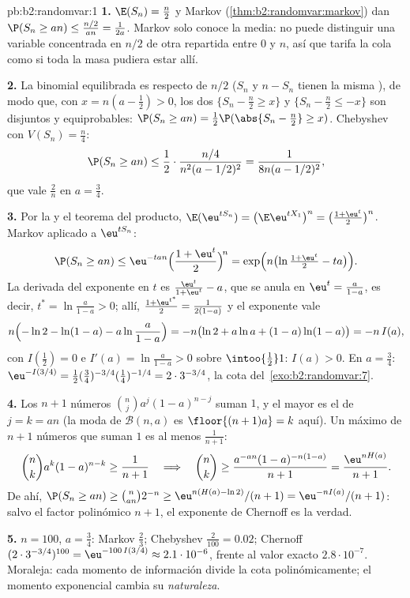 \begin{solution}{pb:b2:randomvar:1}
\textbf{1.} $\E(S_n) = \frac n2$ y Markov
(\cref{thm:b2:randomvar:markov}) dan $\P(S_n \geq an) \leq
\frac{n/2}{an} = \frac1{2a}$. Markov solo conoce la media: no puede
distinguir una variable concentrada en $n/2$ de otra repartida entre
$0$ y $n$, así que tarifa la cola como si toda la masa pudiera estar
allí.

\textbf{2.} La binomial equilibrada es  respecto de $n/2$
($S_n$ y $n - S_n$ tienen la misma ), de modo que, con $x = n(a -
\frac12) > 0$, los dos  $\{S_n - \frac n2 \geq x\}$ y $\{S_n -
\frac n2 \leq -x\}$ son disjuntos y equiprobables: $\P(S_n \geq an) =
\frac12\P(\abs{S_n - \frac n2} \geq x)$. Chebyshev con $V(S_n) =
\frac n4$:
\[
\P(S_n \geq an)
\leq \frac12\cdot\frac{n/4}{n^2(a - 1/2)^2}
= \frac1{8n(a - 1/2)^2},
\]
que vale $\frac2n$ en $a = \frac34$.

\textbf{3.} Por la  y el teorema del producto,
$\E(\eu^{tS_n}) = \bigl(\E \eu^{tX_1}\bigr)^n = \bigl(\frac{1 +
\eu^t}2\bigr)^n$. Markov aplicado a $\eu^{tS_n}$:
\[
\P(S_n \geq an) \leq \eu^{-tan}\Bigl(\frac{1 +
\eu^t}2\Bigr)^{\!n} = \exp\Bigl(n\bigl(\ln\tfrac{1 +
\eu^t}2 - ta\bigr)\Bigr).
\]
La derivada del exponente en $t$ es $\frac{\eu^t}{1 + \eu^t} - a$,
que se anula en $\eu^t = \frac a{1-a}$, es decir, $t^* = \ln\frac
a{1-a} > 0$; allí, $\frac{1 + \eu^{t^*}}2 = \frac1{2(1-a)}$ y el
exponente vale
\[
n\Bigl(-\ln 2 - \ln(1-a) - a\ln\frac a{1-a}\Bigr)
= -n\bigl(\ln2 + a\ln a + (1-a)\ln(1-a)\bigr) = -n\,I(a),
\]
con $I(\frac12) = 0$ e $I'(a) = \ln\frac a{1-a} > 0$ sobre
$\intoo{\frac12}1$: $I(a) > 0$. En $a = \frac34$: $\eu^{-I(3/4)} =
\frac12(\tfrac34)^{-3/4}(\tfrac14)^{-1/4} = 2\cdot3^{-3/4}$, la cota
del~\cref{exo:b2:randomvar:7}.

\textbf{4.} Los $n + 1$ números $\binom nja^j(1-a)^{n-j}$ suman $1$,
y el mayor es el de $j = k = an$ (la moda de $\mathcal B(n, a)$ es
$\floor{(n+1)a} = k$ aquí). Un máximo de $n + 1$ números que suman
$1$ es al menos $\frac1{n+1}$:
\[
\binom nk a^k(1-a)^{n-k} \geq \frac1{n+1}
\quad\Longrightarrow\quad
\binom nk \geq \frac{a^{-an}(1-a)^{-n(1-a)}}{n+1}
= \frac{\eu^{nH(a)}}{n+1}.
\]
De ahí, $\P(S_n \geq an) \geq \binom{n}{an}2^{-n} \geq \eu^{n(H(a) -
\ln2)}/(n+1) = \eu^{-nI(a)}/(n+1)$: salvo el factor polinómico $n +
1$, el exponente de Chernoff es la verdad.

\textbf{5.} $n = 100$, $a = \frac34$: Markov $\frac23$; Chebyshev
$\frac2{100} = 0.02$; Chernoff $(2\cdot3^{-3/4})^{100} =
\eu^{-100\,I(3/4)} \approx 2.1\cdot10^{-6}$, frente al valor exacto
$2.8\cdot10^{-7}$. Moraleja: cada momento de información divide la
cota polinómicamente; el momento exponencial cambia su
\emph{naturaleza}.


\end{solution}

